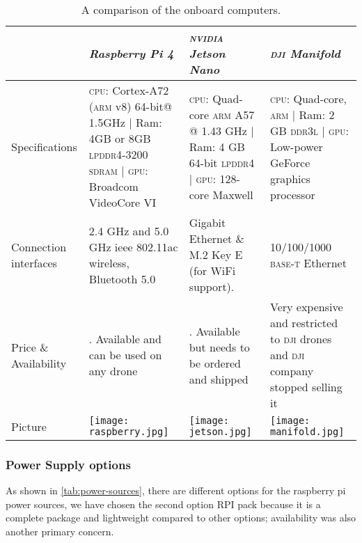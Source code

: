 \documentclass[../main.tex]{subfiles}
\begin{document}
\begin{table}[tbp]
	\centering
	\caption{A comparison of the onboard computers.}
	\label{tab:onboard-computers}  
	\begin{tabular}{ p{3cm} p{4cm} p{4cm} p{4cm} }
		\toprule
		\textit{} & \textit{Raspberry Pi 4} & \textit{\textsc{nvidia} Jetson Nano} & 
		\textit{\textsc{dji} Manifold}\\ \midrule
		Specifications  & \textsc{cpu}: Cortex-A72 (\textsc{arm} v8) 64-bit@ 1.5GHz | Ram: 4GB or 8GB \textsc{lpddr4}-3200 \textsc{sdram} | \textsc{gpu}: Broadcom VideoCore VI & 
		\textsc{cpu}: Quad-core \textsc{arm} A57 @ 1.43 GHz | Ram: 4 GB 64-bit 
		\textsc{lpddr4}   | \textsc{gpu}: 128-core Maxwell & \textsc{cpu}: Quad-core, 
		\textsc{arm} | Ram: 2 GB \textsc{ddr3l} | \textsc{gpu}: Low-power GeForce
		 graphics processor \\ \addlinespace
		Connection interfaces & 2.4 GHz and 5.0 GHz \gls{ieee} 802.11ac wireless,
		 Bluetooth 5.0 & Gigabit Ethernet \& M.2 Key E (for WiFi support). &10/100/1000 
		 \textsc{base-t} Ethernet \\ \addlinespace
		
		Price \& Availability & \qar{300}. Available and can be used on any drone & 
		\qar{400}. Available but needs to be ordered and shipped & Very expensive 
		and restricted to \textsc{dji} drones and \textsc{dji} company stopped 
		selling it \\ \addlinespace
		Picture & \begin{minipage}{.2\textwidth}
			\texttt{[image: raspberry.jpg]}
		\end{minipage}  & \begin{minipage}{.2\textwidth}
			\texttt{[image: jetson.jpg]}
		\end{minipage} & \begin{minipage}{.2\textwidth}
			\texttt{[image: manifold.jpg]}
		\end{minipage} \\
		\bottomrule
	\end{tabular}
\end{table}

\subsubsection{Power Supply options}

As shown in \cref{tab:power-sources}, there are different options for
the raspberry pi power sources, we have chosen the second option
RPI pack because it is a complete package and lightweight compared 
to other options; availability was also another primary concern. 
\end{document}
